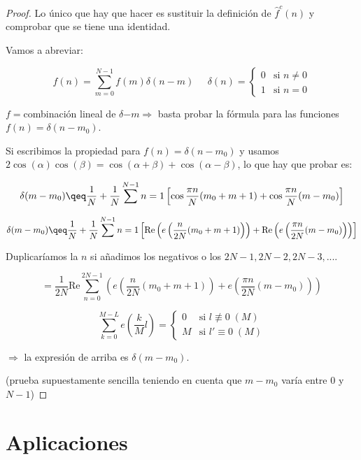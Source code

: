 	\begin{proof}
		Lo único que hay que hacer es sustituir la definición de $\hat{f}^c (n)$ y comprobar que se tiene una identidad.

		Vamos a abreviar:

		$$f(n) = \sum\limits^{N-1}_{m=0} f(m) \delta(n - m) \;\;\;\;\; \delta(n) = \begin{cases}
			0 & \mbox{si } n \neq 0 \\
			1 & \mbox{si } n = 0
		\end{cases}$$

		$f = $combinación lineal de $\delta{-m} \Rightarrow $ basta probar la fórmula para las funciones $f(n) = \delta(n- m_0)$.

		Si escribimos la propiedad para $f(n) = \delta(n - m_0)$ y usamos $2 \cos{(\alpha)} \cos{(\beta)} = \cos{(\alpha + \beta)} + \cos{(\alpha - \beta)}$, lo que hay que probar es:

		$$ \delta(m - m_0) \qeq \frac{1}{N} + \frac{1}{N} \sum\limits^{N-1}{n = 1} \left[ \cos{\frac{\pi n}{N} (m_0 + m + 1)} + \cos{\frac{\pi n}{N} (m - m_0)}   \right] $$

		$$ \delta(m - m_0) \qeq \frac{1}{N} + \frac{1}{N} \sum\limits^{N-1}{n = 1} \left[ \text{Re} \left( e \left( \frac{n}{2N} (m_0 + m + 1) \right) \right) + \text{Re} \left( e \left( \frac{\pi n}{2N} (m - m_0) \right) \right)   \right] $$

		Duplicaríamos la $n$ si añadimos los negativos o los $2N-1, 2N-2, 2N-3,...$.

		$$ = \frac{1}{2N} \text{Re} \sum\limits^{2N-1}_{n=0} \left( e \left( \frac{n}{2N} (m_0 + m + 1) \right) + e \left( \frac{\pi n}{2N} (m - m_0) \right) \right) $$

		$$ \sum\limits^{M - L}_{k = 0} e \left( \frac{k}{M} l \right) = \begin{cases}
			0 & \mbox{si } l \not\equiv 0 \; (M) \\
			M & \mbox{si } l' \equiv 0 \; (M)
		\end{cases}$$

		$\Rightarrow$ la expresión de arriba es $\delta(m - m_0).$

		(prueba supuestamente sencilla teniendo en cuenta que $m-m_0$ varía entre 0 y $N-1$)

	\end{proof} 


\section{Aplicaciones}

